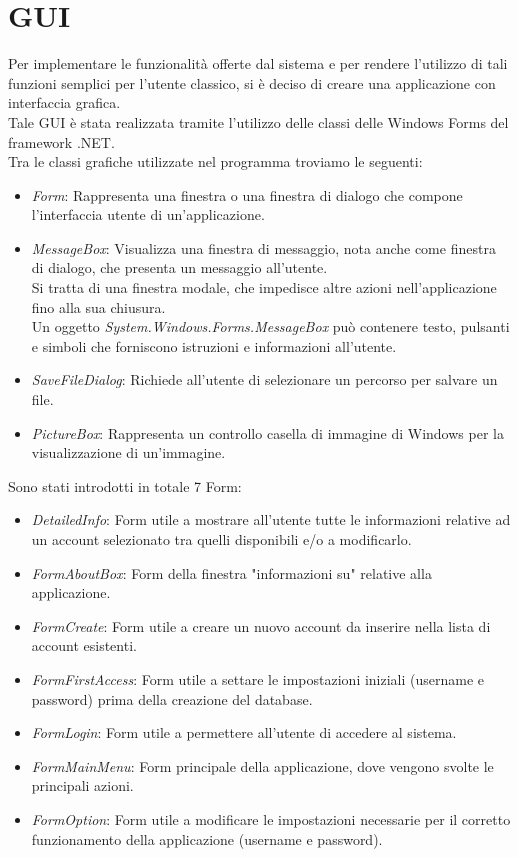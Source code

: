 \documentclass[a4paper,10pt]{report}
\begin{document}
	\section{GUI}
		Per implementare le funzionalità offerte dal sistema e per rendere
			l'utilizzo di tali funzioni semplici per l'utente classico, si è deciso
			di creare una applicazione con interfaccia grafica.\\
			Tale GUI è stata realizzata tramite l'utilizzo delle classi delle
			Windows Forms del framework .NET.\\
			Tra le classi grafiche utilizzate nel programma troviamo le seguenti:
			\begin{itemize}
				\item {\itshape Form}: Rappresenta una finestra o una finestra di dialogo
					che compone l'interfaccia utente di un'applicazione.
				\item {\itshape MessageBox}: Visualizza una finestra di messaggio, nota
					anche come finestra di dialogo, che presenta un messaggio all'utente.\\
					Si tratta di una finestra modale, che impedisce altre azioni
					nell'applicazione fino alla sua chiusura.\\
					Un oggetto {\itshape System.Windows.Forms.MessageBox} può contenere
					testo, pulsanti e simboli che forniscono istruzioni e
					informazioni all'utente.
				\item {\itshape SaveFileDialog}: Richiede all'utente di selezionare un
					percorso per salvare un file.
				\item {\itshape PictureBox}: Rappresenta un controllo casella di
					immagine di Windows per la visualizzazione di un'immagine.
			\end{itemize}
			Sono stati introdotti in totale 7 Form:
			\begin{itemize}
				\item {\itshape DetailedInfo}: Form utile a mostrare all'utente tutte le
					informazioni relative ad un account selezionato tra quelli
					disponibili e/o a modificarlo.
				\item {\itshape FormAboutBox}: Form della finestra "informazioni su"
					relative alla applicazione.
				\item {\itshape FormCreate}: Form utile a creare un nuovo account da
				 	inserire nella lista di account esistenti.
				\item {\itshape FormFirstAccess}: Form utile a settare le impostazioni
					iniziali (username e password) prima della creazione del database.
				\item {\itshape FormLogin}: Form utile a permettere all'utente di
					accedere al sistema.
				\item {\itshape FormMainMenu}: Form principale della applicazione, dove
					vengono svolte le principali azioni.
				\item {\itshape FormOption}: Form utile a modificare le impostazioni
					necessarie per il corretto funzionamento della applicazione
					(username e password).
			\end{itemize}
	\newpage
\end{document}
